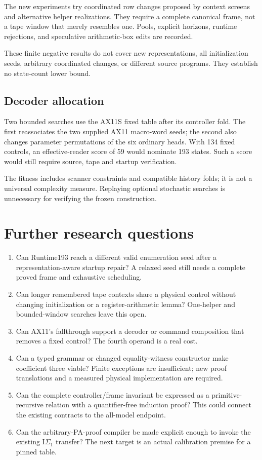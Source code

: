 \documentclass[11pt,letterpaper]{article}
\begin{document}
The new experiments try coordinated row changes proposed by context screens
and alternative helper realizations. They require a complete canonical frame,
not a tape window that merely resembles one. Pools, explicit horizons,
runtime rejections, and speculative arithmetic-box edits are recorded.


These finite negative results do not cover new representations, all
initialization seeds, arbitrary coordinated changes, or different source
programs. They establish no state-count lower bound.

\subsection{Decoder allocation}
Two bounded searches use the AX11S fixed table after its controller fold.
The first reassociates the two supplied AX11 macro-word seeds; the second
also changes parameter permutations of the six ordinary heads. With 134
fixed controls, an effective-reader score of 59 would nominate 193 states.
Such a score would still require source, tape and startup verification.

The fitness includes scanner constraints and compatible history folds;
it is not a universal complexity measure. Replaying optional stochastic
searches is unnecessary for verifying the frozen construction.



\section{Further research questions}
\begin{enumerate}
\item Can Runtime193 reach a different valid enumeration seed after a
representation-aware startup repair? A relaxed seed still needs a
complete proved frame and exhaustive scheduling.
\item Can longer remembered tape contexts share a physical control
without changing initialization or a register-arithmetic lemma?
One-helper and bounded-window searches leave this open.
\item Can AX11's fallthrough support a decoder or command composition
that removes a fixed control? The fourth operand is a real cost.
\item Can a typed grammar or changed equality-witness constructor make
coefficient three viable? Finite exceptions are insufficient; new proof
translations and a measured physical implementation are required.
\item Can the complete controller/frame invariant be expressed as a
primitive-recursive relation with a quantifier-free induction proof?
This could connect the existing contracts to the all-model endpoint.
\item Can the arbitrary-PA-proof compiler be made explicit enough to
invoke the existing $\mathrm I\Sigma_1$ transfer? The next target is an
actual calibration premise for a pinned table.
\end{enumerate}
\end{document}
